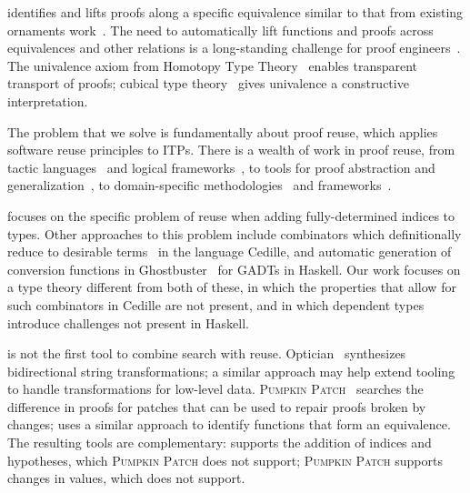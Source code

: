 
\toolnameb identifies and lifts proofs along a specific equivalence 
similar to that from existing ornaments work~\cite{ko2016programming}.
The need to automatically lift functions and proofs
across equivalences and other relations is a long-standing challenge for proof 
engineers~\cite{magaud2000changing, barthe2001type, magaud2003changing, huffman2013lifting, zimmermann2015automatic, cohen:hal-01414881}.
The univalence axiom from Homotopy Type Theory~\cite{univalent2013homotopy} enables transparent transport of proofs;
cubical type theory~\cite{cohen2016cubical} gives univalence a constructive interpretation. 

The problem that we solve is fundamentally about proof reuse,
which applies software reuse principles to ITPs. 
There is a wealth of work in proof reuse, from tactic languages~\cite{felty1994generalization} and logical frameworks~\cite{caplan1995logical},
to tools for proof abstraction and generalization~\cite{pons2000generalization, johnsen2004theorem},
to domain-specific methodologies~\cite{Delaware:2011:PLT:2048066.2048113} and frameworks~\cite{Delaware:2013:MLC:2429069.2429094}.

\toolnameb focuses on the specific problem of reuse
when adding fully-determined indices to types.
Other approaches to this problem include combinators which definitionally reduce to desirable terms~\cite{DBLP:journals/corr/abs-1803-08150} in the language Cedille,
and automatic generation of conversion functions in Ghostbuster~\cite{McDonell:2016:GTS:2951913.2951914} for GADTs in Haskell.
Our work focuses on a type theory different from both of these, in which the properties that allow for such combinators in Cedille are not present, and in which dependent types introduce challenges not present in Haskell.

\toolnameb is not the first tool to combine search with reuse. 
Optician~\cite{miltner2017synthesizing} synthesizes bidirectional string transformations;
a similar approach may help extend tooling to handle transformations for low-level data.
\textsc{Pumpkin Patch}~\cite{ringer2018adapting} 
searches the difference in proofs for patches that can be used to repair proofs broken by changes;
\toolnameb uses a similar approach to identify functions
that form an equivalence. The resulting tools are complementary: \toolnameb supports the addition
of indices and hypotheses, which \textsc{Pumpkin Patch} does not support; \textsc{Pumpkin Patch} supports changes
in values, which \toolnameb does not support. 

